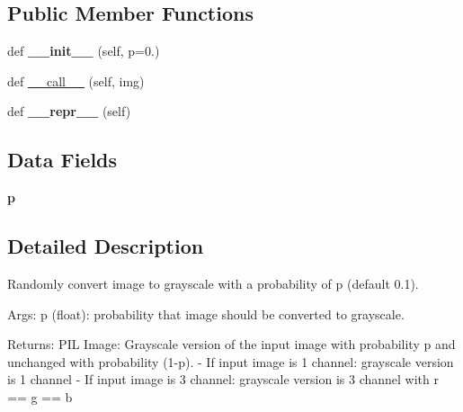\subsection*{Public Member Functions}
\begin{DoxyCompactItemize}
\item 
\mbox{\label{classtorchvision_1_1transforms_1_1transforms_1_1RandomGrayscale_a872f78dec80c8ba267a2f64c7dca58f5}} 
def {\bfseries \+\_\+\+\_\+init\+\_\+\+\_\+} (self, p=0.)
\item 
def \hyperlink{classtorchvision_1_1transforms_1_1transforms_1_1RandomGrayscale_aa02b86308d282e359f0cfb294fbb53ba}{\+\_\+\+\_\+call\+\_\+\+\_\+} (self, img)
\item 
\mbox{\label{classtorchvision_1_1transforms_1_1transforms_1_1RandomGrayscale_acbfd0a6b439bef3367925b1a9a15c03d}} 
def {\bfseries \+\_\+\+\_\+repr\+\_\+\+\_\+} (self)
\end{DoxyCompactItemize}
\subsection*{Data Fields}
\begin{DoxyCompactItemize}
\item 
\mbox{\label{classtorchvision_1_1transforms_1_1transforms_1_1RandomGrayscale_aaa06c8ad7d665c40d6d58f85fa3d0ea9}} 
{\bfseries p}
\end{DoxyCompactItemize}


\subsection{Detailed Description}
\begin{DoxyVerb}Randomly convert image to grayscale with a probability of p (default 0.1).

Args:
    p (float): probability that image should be converted to grayscale.

Returns:
    PIL Image: Grayscale version of the input image with probability p and unchanged
    with probability (1-p).
    - If input image is 1 channel: grayscale version is 1 channel
    - If input image is 3 channel: grayscale version is 3 channel with r == g == b\end{DoxyVerb}
 

